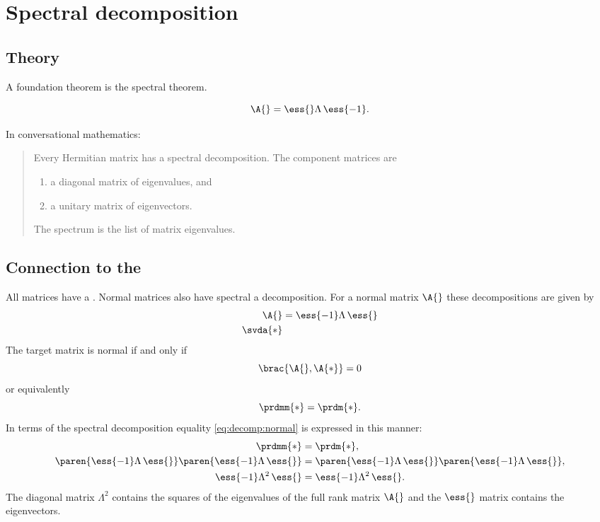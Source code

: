 \section[$\A{} = \ess{}\Lambda\,\ess{-1}$]{Spectral decomposition}

\subsection{Theory}
A foundation theorem is the spectral theorem.

\begin{equation}
\A{} = \ess{}\Lambda\,\ess{-1}.
\end{equation}

In conversational mathematics: 
\begin{quote}
Every Hermitian matrix has a spectral decomposition. The component matrices are
\begin{enumerate}
\item a diagonal matrix of eigenvalues, and
\item a unitary matrix of eigenvectors.
\end{enumerate}
The spectrum is the list of matrix eigenvalues.
 \end{quote}

\subsection{Connection to the \svdl}
All matrices have a \svdl. Normal matrices also have spectral a decomposition. For a normal matrix $\A{}$ these decompositions are given by
\begin{equation}
  \begin{split}
    \A{}&=\ess{-1}\Lambda\,\ess{} \\
    \svda{*}
  \end{split}
\end{equation}
The target matrix is normal if and only if
\begin{equation}
  \brac{\A{},\A{*}} = 0
\end{equation}
or equivalently
\begin{equation}
  \prdmm{*} = \prdm{*}.
  \label{eq:decomp:normal}
\end{equation}
In terms of the spectral decomposition equality \eqref{eq:decomp:normal} is expressed in this manner:
\begin{equation}
  \begin{split}
     \prdmm{*} &= \prdm{*},\\
     \paren{\ess{-1}\Lambda\,\ess{}}\paren{\ess{-1}\Lambda\,\ess{}} &= \paren{\ess{-1}\Lambda\,\ess{}}\paren{\ess{-1}\Lambda\,\ess{}},\\     
     \ess{-1}\Lambda^{2}\,\ess{} &= \ess{-1}\Lambda^{2}\,\ess{}.     
  \end{split}
\end{equation}
The diagonal matrix $\Lambda^{2}$ contains the squares of the eigenvalues of the full rank matrix $\A{}$ and the $\ess{}$ matrix contains the eigenvectors.

